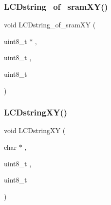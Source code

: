 \mbox{\label{lcd_8h_a2ce021ecffcb6598a70481c2dd98b6a8}} 
\subsubsection{L\+C\+Dstring\+\_\+of\+\_\+sram\+X\+Y()}
{\footnotesize\ttfamily void L\+C\+Dstring\+\_\+of\+\_\+sram\+XY (\begin{DoxyParamCaption}\item[{uint8\+\_\+t $\ast$}]{,  }\item[{uint8\+\_\+t}]{,  }\item[{uint8\+\_\+t}]{ }\end{DoxyParamCaption})}

\mbox{\label{lcd_8h_a08ebc8e14d0c6213c708b1eb92ec9ec7}} 
\subsubsection{L\+C\+Dstring\+X\+Y()}
{\footnotesize\ttfamily void L\+C\+Dstring\+XY (\begin{DoxyParamCaption}\item[{char $\ast$}]{,  }\item[{uint8\+\_\+t}]{,  }\item[{uint8\+\_\+t}]{ }\end{DoxyParamCaption})}

